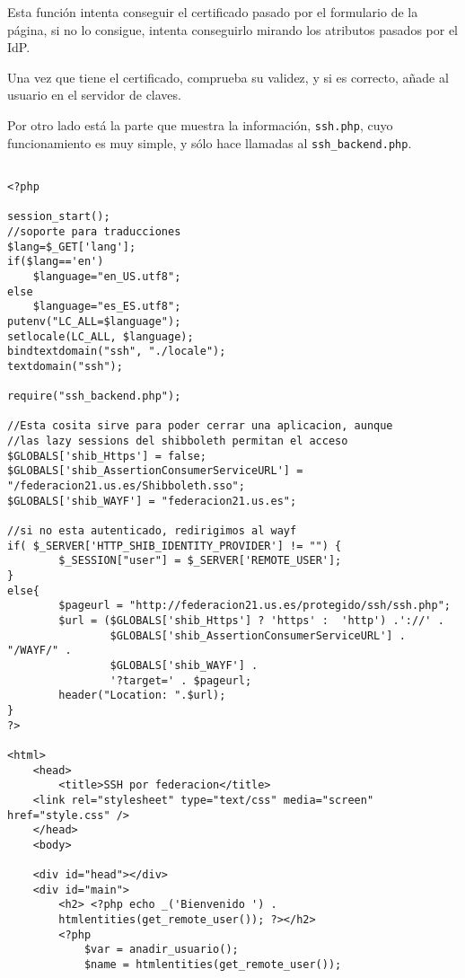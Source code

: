 \begin{itemize}
\begin{lstlisting}
    \end{lstlisting}

    Esta función intenta conseguir el certificado pasado por el formulario
    de la página, si no lo consigue, intenta conseguirlo mirando los
    atributos pasados por el IdP.

    Una vez que tiene el certificado, comprueba su validez, y si es
    correcto, añade al usuario en el servidor de claves.

    \end{itemize}

    Por otro lado está la parte que muestra la información,
    \texttt{ssh.php}, cuyo funcionamiento es muy simple, y sólo hace
    llamadas al \texttt{ssh\_backend.php}.

    \begin{lstlisting}

<?php 

session_start();
//soporte para traducciones
$lang=$_GET['lang'];
if($lang=='en')
    $language="en_US.utf8";
else
    $language="es_ES.utf8";
putenv("LC_ALL=$language");
setlocale(LC_ALL, $language);
bindtextdomain("ssh", "./locale");
textdomain("ssh");

require("ssh_backend.php");

//Esta cosita sirve para poder cerrar una aplicacion, aunque
//las lazy sessions del shibboleth permitan el acceso
$GLOBALS['shib_Https'] = false;
$GLOBALS['shib_AssertionConsumerServiceURL'] =
"/federacion21.us.es/Shibboleth.sso";
$GLOBALS['shib_WAYF'] = "federacion21.us.es";

//si no esta autenticado, redirigimos al wayf
if( $_SERVER['HTTP_SHIB_IDENTITY_PROVIDER'] != "") {
        $_SESSION["user"] = $_SERVER['REMOTE_USER'];
}
else{
        $pageurl = "http://federacion21.us.es/protegido/ssh/ssh.php";
        $url = ($GLOBALS['shib_Https'] ? 'https' :  'http') .'://' .
                $GLOBALS['shib_AssertionConsumerServiceURL'] . "/WAYF/" .
                $GLOBALS['shib_WAYF'] .
                '?target=' . $pageurl;
        header("Location: ".$url);
}
?>

<html>
    <head>
        <title>SSH por federacion</title>
	<link rel="stylesheet" type="text/css" media="screen" href="style.css" />
    </head>
    <body>

	<div id="head"></div>
	<div id="main">
        <h2> <?php echo _('Bienvenido ') .
        htmlentities(get_remote_user()); ?></h2>
        <?php
            $var = anadir_usuario();
            $name = htmlentities(get_remote_user());


\end{lstlisting}
